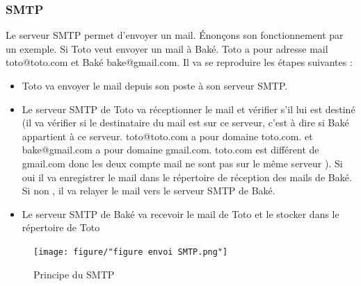\documentclass[a4paper,12pt,french]{report} %
\begin{document}
\subsubsection{SMTP}
Le serveur SMTP permet d'envoyer un mail. Énonçons son fonctionnement par un exemple. Si Toto veut envoyer un mail à Baké. Toto a pour adresse mail toto@toto.com et Baké bake@gmail.com. Il va se reproduire les étapes suivantes :
\begin{itemize}
	\item Toto va envoyer le mail depuis son poste à son serveur SMTP. 
	\item Le serveur SMTP de Toto va réceptionner le mail et vérifier s'il lui est destiné (il va vérifier si le destinataire du mail est sur ce serveur, c'est à dire si Baké appartient à ce serveur. toto@toto.com a pour domaine toto.com. et bake@gmail.com a pour domaine gmail.com. toto.com est différent de gmail.com donc les deux compte mail ne sont pas sur le même serveur ). Si oui il va enregistrer le mail dans le répertoire de réception des mails de Baké. Si non , il va relayer le mail vers le serveur SMTP de Baké. 
	\item Le serveur SMTP de Baké va recevoir le mail de Toto et le stocker dans le répertoire de Toto	   
\end{itemize}
\begin{figure}
\begin{center}
\texttt{[image: figure/"figure envoi SMTP.png"]} 
\end{center}
\caption{Principe du SMTP}
\label{Principer du SMTP}
\end{figure}
\end{document}
